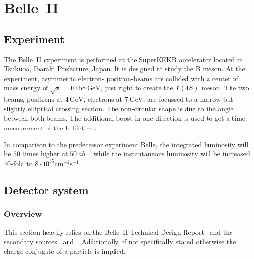 \chapter{Belle~\RN{2}}
\label{chap:belle2_experiment}

\section{Experiment}
\label{sec:experimental}

The Belle~\RN{2} experiment is performed at the SuperKEKB accelerator located in Tsukuba, Ibaraki Prefecture, Japan. It is designed to study the B meson.
At the experiment, asymmetric electron- positron-beams are collided with a center of mass energy of $\sqrt{s} = 10.58 \mathrm{~GeV}$, just right to create the $\Upsilon (4S)$ meson. The two beams, positrons at $4 \mathrm{~GeV}$, electrons at $7 \mathrm{~GeV}$, are focussed to a narrow but slightly elliptical crossing section. The non-circular shape is due to the angle between both beams. The additional boost in one direction is used to get a time measurement of the B-lifetime.

In comparison to the predecessor experiment Belle, the integrated luminosity will be $50$ times higher at $50~{ab}^{-1}$ while the instantaneous luminosity will be increased $40$-fold to $8 \cdot 10^{35} \mathrm{cm}^{-2} \mathrm{s}^{-1}$.

\section{Detector system}
\label{sec:detector_system}

\subsection{Overview}
\label{subsec:detector_system_overview}

This section heavily relies on the Belle~\RN{2} Technical Design Report~\cite{Abe:2010gxa} and the secondary sources~\cite{Pulvermacher:SuperKEKBDetectorComponents} and~\cite{Pulvermacher:AnalysisSoftware}. Additionally, if not specifically stated otherwise the charge conjugate of a particle is implied.

